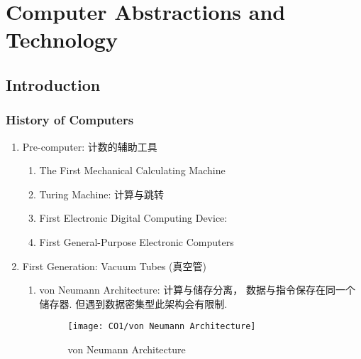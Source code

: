 \newpage
\section{Computer Abstractions and Technology}

\subsection{Introduction}

\subsubsection{History of Computers}

\begin{enumerate}
    \item Pre-computer: 计数的辅助工具
    \begin{enumerate}
        \item The First Mechanical Calculating Machine
        \item Turing Machine: 计算与跳转
        \item First Electronic Digital Computing Device: 
        \item First General-Purpose Electronic Computers
    \end{enumerate}
    \item First Generation: Vacuum Tubes (真空管)
    \begin{enumerate}
        \item von Neumann Architecture: 计算与储存分离， 数据与指令保存在同一个储存器. 但遇到数据密集型此架构会有限制. 
        \begin{figure}[H]
            \centering
            \texttt{[image: CO1/von Neumann Architecture]}
            \caption{von Neumann Architecture}
        \end{figure}
        

\end{enumerate}
\end{enumerate}
